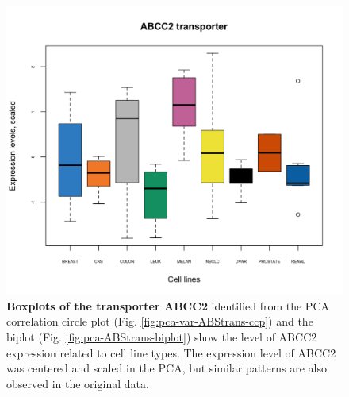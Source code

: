 \documentclass[]{book}
\newenvironment{Shaded}{\begin{snugshade}}{\end{snugshade}}
\newcommand{\KeywordTok}[1]{\textcolor[rgb]{0.13,0.29,0.53}{\textbf{#1}}}
\newcommand{\DataTypeTok}[1]{\textcolor[rgb]{0.13,0.29,0.53}{#1}}
\newcommand{\DecValTok}[1]{\textcolor[rgb]{0.00,0.00,0.81}{#1}}
\newcommand{\FloatTok}[1]{\textcolor[rgb]{0.00,0.00,0.81}{#1}}
\newcommand{\StringTok}[1]{\textcolor[rgb]{0.31,0.60,0.02}{#1}}
\newcommand{\CommentTok}[1]{\textcolor[rgb]{0.56,0.35,0.01}{\textit{#1}}}
\newcommand{\OtherTok}[1]{\textcolor[rgb]{0.56,0.35,0.01}{#1}}
\newcommand{\OperatorTok}[1]{\textcolor[rgb]{0.81,0.36,0.00}{\textbf{#1}}}
\newcommand{\NormalTok}[1]{#1}
\begin{document}
\begin{Shaded}
\end{Shaded}

\begin{figure}

{\centering \includegraphics[width=0.5\linewidth]{Figures/PCA/pca-ABCtrans-boxplot-1} 

}

\caption{\textbf{Boxplots of the transporter ABCC2}
identified from the PCA correlation circle plot (Fig.
\ref{fig:pca-var-ABStrans-ccp}) and the biplot (Fig.
\ref{fig:pca-ABStrans-biplot}) show the level of ABCC2 expression
related to cell line types. The expression level of ABCC2 was centered
and scaled in the PCA, but similar patterns are also observed in the
original data.}\label{fig:pca-ABCtrans-boxplot}
\end{figure}
\end{document}
